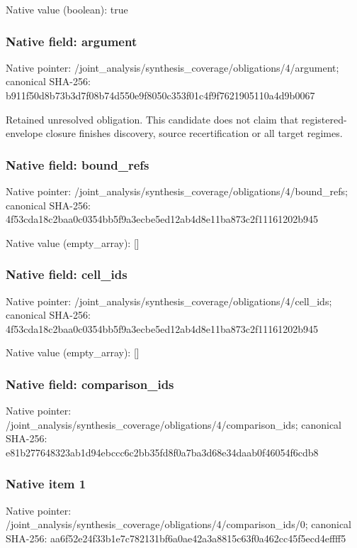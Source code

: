 \documentclass[10pt,a4paper]{article}
\begin{document}
Native value (boolean): true

\subsubsection{Native field: argument}
Native pointer: /joint\_\allowbreak{}analysis/synthesis\_\allowbreak{}coverage/obligations/4/argument; canonical SHA-256: b911f50d8b73b3d7f08b74d550e9f8050c353f01c4f9f7621905110a4d9b0067

\begingroup\raggedright\sloppy Retained unresolved obligation. This candidate does not claim that registered-envelope closure finishes discovery,\allowbreak{} source recertification or all target regimes.\par\endgroup

\subsubsection{Native field: bound\_\allowbreak{}refs}
Native pointer: /joint\_\allowbreak{}analysis/synthesis\_\allowbreak{}coverage/obligations/4/bound\_\allowbreak{}refs; canonical SHA-256: 4f53cda18c2baa0c0354bb5f9a3ecbe5ed12ab4d8e11ba873c2f11161202b945

Native value (empty\_\allowbreak{}array): []

\subsubsection{Native field: cell\_\allowbreak{}ids}
Native pointer: /joint\_\allowbreak{}analysis/synthesis\_\allowbreak{}coverage/obligations/4/cell\_\allowbreak{}ids; canonical SHA-256: 4f53cda18c2baa0c0354bb5f9a3ecbe5ed12ab4d8e11ba873c2f11161202b945

Native value (empty\_\allowbreak{}array): []

\subsubsection{Native field: comparison\_\allowbreak{}ids}
Native pointer: /joint\_\allowbreak{}analysis/synthesis\_\allowbreak{}coverage/obligations/4/comparison\_\allowbreak{}ids; canonical SHA-256: e81b277648323ab1d94ebccc6c2bb35fd8f0a7ba3d68e34daab0f46054f6cdb8

\subsubsection{Native item 1}
Native pointer: /joint\_\allowbreak{}analysis/synthesis\_\allowbreak{}coverage/obligations/4/comparison\_\allowbreak{}ids/0; canonical SHA-256: aa6f52e24f33b1e7c782131bf6a0ae42a3a8815c63f0a462cc45f5ecd4effff5
\end{document}
